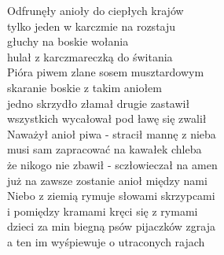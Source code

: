 
\begin{flushleft}
Odfrunęły anioły do ciepłych krajów  \\
tylko jeden w karczmie na rozstaju  \\
głuchy na boskie wołania \tab{} \\
hulał z karczmareczką do świtania  \\
\vskip 3mm
Pióra piwem zlane sosem musztardowym  \\
skaranie boskie z takim aniołem   \\
jedno skrzydło złamał drugie zastawił  \\
wszystkich wycałował pod ławę się zwalił  \\
\vskip 3mm
Naważył anioł piwa - stracił mannę z nieba  \\
musi sam zapracować na kawałek chleba  \\
że nikogo nie zbawił - sczłowieczał na amen  \\
już na zawsze zostanie anioł między nami  \\
\vskip 3mm
Niebo z ziemią rymuje słowami skrzypcami  \\
i pomiędzy kramami kręci się z rymami  \\
dzieci za min biegną psów pijaczków zgraja  \\
a ten im wyśpiewuje o utraconych rajach \\
\end{flushleft}
\clearpage
